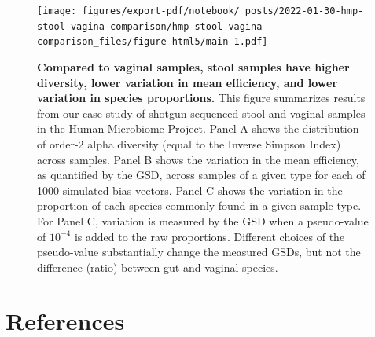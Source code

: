 \documentclass[
]{article}
\begin{document}
\begin{figure}
\centering
\texttt{[image: figures/export-pdf/notebook/\_posts/2022-01-30-hmp-stool-vagina-comparison/hmp-stool-vagina-comparison\_files/figure-html5/main-1.pdf]}
\caption{\label{fig:gut}\textbf{Compared to vaginal samples, stool samples have higher diversity, lower variation in mean efficiency, and lower variation in species proportions.} This figure summarizes results from our case study of shotgun-sequenced stool and vaginal samples in the Human Microbiome Project. Panel A shows the distribution of order-2 alpha diversity (equal to the Inverse Simpson Index) across samples. Panel B shows the variation in the mean efficiency, as quantified by the GSD, across samples of a given type for each of 1000 simulated bias vectors. Panel C shows the variation in the proportion of each species commonly found in a given sample type. For Panel C, variation is measured by the GSD when a pseudo-value of \(10^{-4}\) is added to the raw proportions. Different choices of the pseudo-value substantially change the measured GSDs, but not the difference (ratio) between gut and vaginal species.}
\end{figure}



\hypertarget{references}{%
\section*{References}\label{references}}
\end{document}
